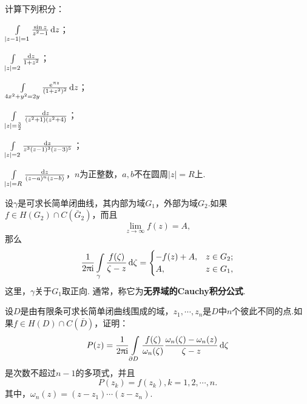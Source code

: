 \begin{xiti}
  \item 计算下列积分：
  \begin{enuma}
    \item $\int\limits_{|z-1|=1}\frac{\sin z}{z^2-1}\mathop{}\!\mathrm dz$；
    \item $\int\limits_{|z|=2}\frac{\mathop{}\!\mathrm dz}{1+z^2}$；
    \item $\int\limits_{4x^2+y^2=2y}\frac{\operatorname{\!\!\;\mathrm e}^{\uppi z}}{(1+z^2)^2}\mathop{}\!\mathrm dz$；
    \item $\int\limits_{|z|=\frac32}\frac{\mathop{}\!\mathrm dz}{(z^2+1)(z^2+4)}$；
    \item $\int\limits_{|z|=2}\frac{\mathop{}\!\mathrm dz}{z^3(z-1)^3(z-3)^5}$；
    \item $\int\limits_{|z|=R}\frac{\mathop{}\!\mathrm dz}{(z-a)^n(z-b)}$，$n$为正整数，$a,b$不在圆周$|z|=R$上.
  \end{enuma}
  \item 设$\gamma$是可求长简单闭曲线，其内部为域$G_1$，外部为域$G_2$.如果$f\in H(G_2)\cap C(\bar G_2)$，而且
    \[
      \lim_{z\to\infty}f(z) = A,
    \]
    那么
    \[
      \frac1{2\uppi\mathrm i}\int\limits_\gamma\frac{f(\zeta)}{\zeta-z}\mathop{}\!\mathrm{d} \zeta
      = \begin{cases}
      -f(z) + A, & z\in G_2;\\
      A, & z\in G_1,
      \end{cases}
    \]
    这里，$\gamma$关于$G_1$取正向. 通常，称它为\textbf{无界域的Cauchy积分公式}.
  \item 设$D$是由有限条可求长简单闭曲线围成的域，$z_1,\cdots,z_n$是$D$中$n$个彼此不同的点.如果$f\in H(D)\cap C(\bar D)$，证明：
    \[
      P(z) = \frac1{2\uppi\mathrm i}\int\limits_{\partial D}\frac{f(\zeta)}{\omega_n(\zeta)}
      \frac{\omega_n(\zeta)-\omega_n(z)}{\zeta-z}\mathop{}\!\mathrm{d} \zeta
    \]
    是次数不超过$n-1$的多项式，并且
    \[
      P(z_k) = f(z_k), k=1,2,\cdots,n.
    \]
    其中，$\omega_n(z)=(z-z_1)\cdots(z-z_n)$.


\end{xiti}
